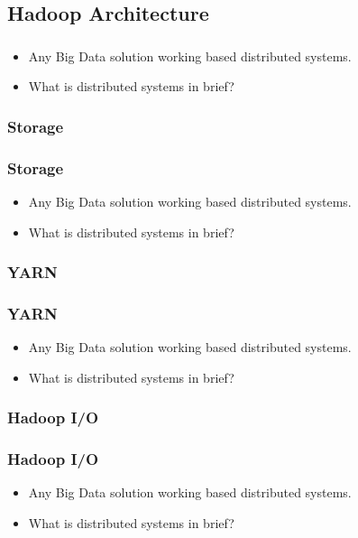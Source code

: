 \subsection{Hadoop Architecture}
\begin{frame}
\frametitle{\subsecname}
\begin{itemize}[<+->]
	\item Any Big Data solution working based distributed systems.
	\item What is distributed systems in brief?
\end{itemize}
\end{frame}



\subsubsection{Storage}
\begin{frame}
\frametitle{Storage}
\begin{itemize}[<+->]
	\item Any Big Data solution working based distributed systems.
	\item What is distributed systems in brief?
\end{itemize}
\end{frame}


\subsubsection{YARN}
\begin{frame}
\frametitle{YARN}
\begin{itemize}[<+->]
	\item Any Big Data solution working based distributed systems.
	\item What is distributed systems in brief?
\end{itemize}
\end{frame}


\subsubsection{Hadoop I/O}
\begin{frame}
\frametitle{Hadoop I/O}
\begin{itemize}[<+->]
	\item Any Big Data solution working based distributed systems.
	\item What is distributed systems in brief?
\end{itemize}
\end{frame}

